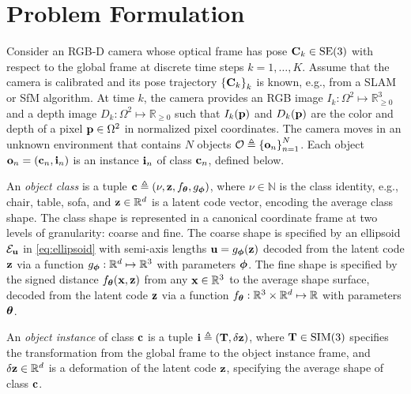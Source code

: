 \section{Problem Formulation}
\label{sec:problem}


Consider an RGB-D camera whose optical frame has pose $\mathbf{C}_k \in \text{SE}(3)$ with respect to the global frame at discrete time steps $k = 1,\ldots,K$. Assume that the camera is calibrated and its pose trajectory $\left\{\mathbf{C}_k\right\}_k$ is known, e.g., from a SLAM or SfM algorithm. At time $k$, the camera provides an RGB image $I_k : \Omega^2 \mapsto \mathbb{R}_{\geq 0}^3$ and a depth image $D_k : \Omega^2 \mapsto \mathbb{R}_{\geq 0}$ such that $I_k(\mathbf{p})$ and $D_k(\mathbf{p})$ are the color and depth of a pixel $\mathbf{p} \in \Omega^2$ in normalized pixel coordinates. The camera moves in an unknown environment that contains $N$ objects ${\cal O} \triangleq \left\{\mathbf{o}_n\right\}_{n=1}^N$. Each object $\mathbf{o}_n = (\mathbf{c}_n,\mathbf{i}_n)$ is an instance $\mathbf{i}_n$ of class $\mathbf{c}_n$, defined below.


\begin{definition*}
An \emph{object class} is a tuple $\mathbf{c} \triangleq \left(\nu, \mathbf{z}, f_{\boldsymbol{\theta}}, g_{\boldsymbol{\phi}}\right)$, where $\nu \in \mathbb{N}$ is the class identity, e.g., chair, table, sofa, and $\mathbf{z} \in \mathbb{R}^d$ is a latent code vector, encoding the average class shape. The class shape is represented in a canonical coordinate frame at two levels of granularity: coarse and fine. The coarse shape is specified by an ellipsoid ${\cal E}_{\mathbf{u}}$ in \eqref{eq:ellipsoid} with semi-axis lengths $\mathbf{u} = g_{\boldsymbol{\phi}}(\mathbf{z})$ decoded from the latent code $\mathbf{z}$ via a function $g_{\boldsymbol{\phi}} : \mathbb{R}^d \mapsto \mathbb{R}^3$ with parameters $\boldsymbol{\phi}$. The fine shape is specified by the signed distance $f_{\boldsymbol{\theta}}(\mathbf{x},\mathbf{z})$ from any $\mathbf{x} \in \mathbb{R}^3$ to the average shape surface, decoded from the latent code $\mathbf{z}$ via a function $f_{\boldsymbol{\theta}} : \mathbb{R}^3 \times \mathbb{R}^d \mapsto \mathbb{R}$ with parameters $\boldsymbol{\theta}$.
\end{definition*}

\begin{definition*}
An \emph{object instance} of class $\mathbf{c}$ is a tuple $\mathbf{i} \triangleq \left(\mathbf{T}, \delta\mathbf{z}\right)$, where $\mathbf{T} \in \text{SIM}(3)$ specifies the transformation from the global frame to the object instance frame, and $\delta\mathbf{z} \in \mathbb{R}^d$ is a deformation of the latent code $\mathbf{z}$, specifying the average shape of class $\mathbf{c}$.
\end{definition*}


